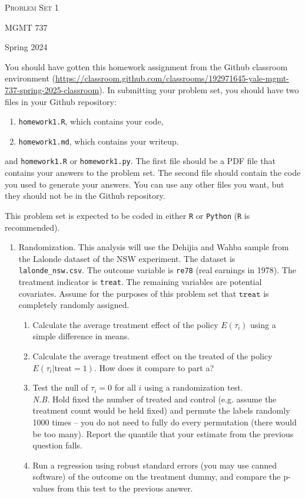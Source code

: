 \documentclass[11pt, a4paper]{article}
\begin{document}
\begin{center}
  {\Large \textsc{Problem Set 1}}

  MGMT 737
\end{center}
\begin{center}
  Spring 2024
\end{center}

You should have gotten this homework assignment from the Github classroom environment (\url{https://classroom.github.com/classrooms/192971645-yale-mgmt-737-spring-2025-classroom}). In submitting your problem set, you should have two files in your Github repository:

\begin{enumerate}
  \item \texttt{homework1.R}, which contains your code,
  \item  \texttt{homework1.md}, which contains your writeup.
\end{enumerate} and \texttt{homework1.R} or \texttt{homework1.py}. The first file should be a PDF file that contains your answers to the problem set. The second file should contain the code you used to generate your answers. You can use any other files you want, but they should not be in the Github repository.


This problem set is expected to be coded in either \texttt{R} or \texttt{Python} (\texttt{R} is  recommended). 

\begin{enumerate}
\item Randomization. This analysis will use the Dehijia
  and Wahba sample from the Lalonde dataset of the NSW experiment. The dataset is
  \texttt{lalonde\_nsw.csv}. The outcome variable is \texttt{re78}
  (real earnings in 1978). The treatment indicator is
  \texttt{treat}. The remaining variables are potential covariates. Assume for the purposes of this problem set that $\texttt{treat}$ is completely randomly assigned. 
  \begin{enumerate}
  \item Calculate the average treatment effect of the policy
    $E(\tau_{i})$ using a simple difference in means.
  \item Calculate the average treatment effect on the treated of the policy
    $E(\tau_{i}| \mathrm{treat} = 1)$. How does it compare to part a? 
  \item Test the null of $\tau_{i} = 0$ for all $i$ using a
    randomization test. \\
    \emph{N.B.} Hold fixed the number of treated and control
    (e.g. assume the treatment count would be held fixed) and permute
    the labels randomly 1000 times -- you do not need to fully do
    every permutation (there would be too many). Report the quantile
    that your estimate from the previous question falls.
  \item Run a regression using robust standard errors (you may use
    canned software) of the outcome on the treatment dummy, and
    compare the p-values from this test to the previous answer.
  \end{enumerate}  
\end{enumerate}
\end{document}
